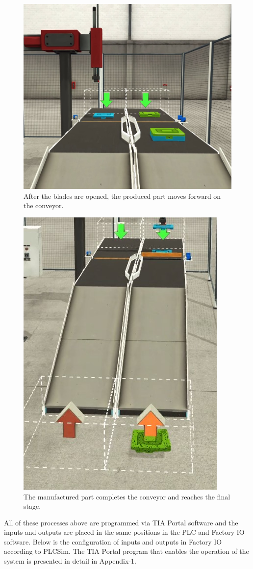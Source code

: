 \begin{figure}[H]
    \centering
    \includegraphics[width=0.8\columnwidth]{imgs/io/7.jpg}
    \caption[After the blades are opened, the produced part moves forward on the conveyor.]{After the blades are opened, the produced part moves forward on the conveyor.}
    \label{fig-magnitude}
\end{figure}%
\begin{figure}[H]
    \centering
    \includegraphics[width=0.5\columnwidth]{imgs/io/10.jpg}
    \caption[The manufactured part completes the conveyor and reaches the final stage.]{The manufactured part completes the conveyor and reaches the final stage.}
    \label{fig-magnitude}
\end{figure}%

All of these processes above are programmed via TIA Portal software and the inputs and outputs are placed in the same positions in the PLC and Factory IO software.
Below is the configuration of inputs and outputs in Factory IO according to PLCSim. The TIA Portal program that enables the operation of the system is presented in detail in Appendix-1.

